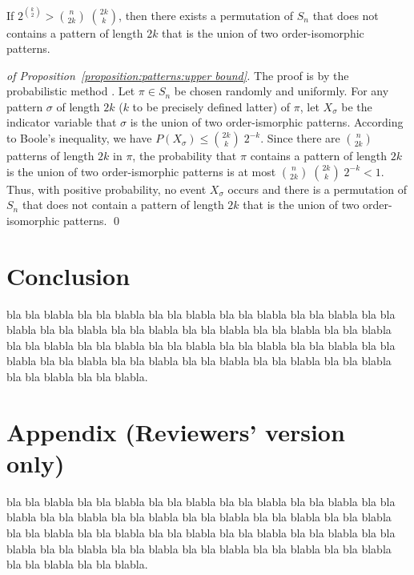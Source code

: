 \documentclass[a4paper,10pt]{llncs}
\begin{document}
\begin{proposition}
  \label{proposition:patterns:upper bound}
  If $2^{\binom{k}{2}} > \binom{n}{2k}\;\binom{2k}{k}$, then there exists
  a permutation of $S_{n}$ 
  that does not contains a pattern
  of length $2k$ that is the union of two
  order-isomorphic patterns.
\end{proposition}

\begin{proof}[of Proposition~\ref{proposition:patterns:upper bound}]
The proof is by the probabilistic method \cite{Alon:Spencer:1992}.
Let $\pi \in S_n$ be chosen randomly and uniformly.
For any pattern $\sigma$ of length $2k$ ($k$ to be precisely defined latter)
of $\pi$,
let $X_\sigma$ be the indicator variable that 
$\sigma$ is the union of two order-ismorphic patterns.
According to Boole's inequality, we have
$P\left(X_\sigma\right) \leq \binom{2k}{k}\;2^{-k}$.
Since there are $\binom{n}{2k}$ patterns of length $2k$ in $\pi$,
the probability that $\pi$ contains a pattern of length $2k$ 
is the union of two order-ismorphic patterns is at most
$\binom{n}{2k}\;\binom{2k}{k}\;2^{-k} < 1$.
Thus, with positive probability, no event $X_\sigma$ occurs and 
there is a permutation of $S_n$ that does not contain a pattern
of length $2k$ that is the union of two order-isomorphic patterns.
\qed
\end{proof}


\section{Conclusion}
\label{section:Conclusion}

bla bla blabla bla bla blabla bla bla blabla bla bla blabla bla bla blabla
bla bla blabla bla bla blabla bla bla blabla bla bla blabla bla bla blabla
bla bla blabla bla bla blabla bla bla blabla bla bla blabla bla bla blabla
bla bla blabla bla bla blabla bla bla blabla bla bla blabla bla bla blabla
bla bla blabla bla bla blabla bla bla blabla bla bla blabla.







\newpage
\section*{Appendix (Reviewers' version only)}

bla bla blabla bla bla blabla bla bla blabla bla bla blabla bla bla blabla
bla bla blabla bla bla blabla bla bla blabla bla bla blabla bla bla blabla
bla bla blabla bla bla blabla bla bla blabla bla bla blabla bla bla blabla
bla bla blabla bla bla blabla bla bla blabla bla bla blabla bla bla blabla
bla bla blabla bla bla blabla bla bla blabla bla bla blabla.

\end{document}
